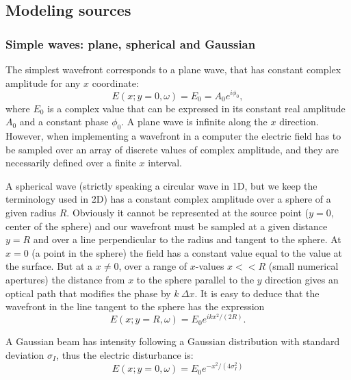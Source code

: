 \documentclass[preprint]{iucr}              %
\begin{document}
\subsection{Modeling sources}
\label{sec:sources}

\subsubsection{Simple waves: plane, spherical and Gaussian}

The simplest wavefront corresponds to a plane wave, that has constant complex amplitude for any $x$ coordinate: 
\begin{equation}
   E(x;y=0,\omega)=E_0=A_0 e^{i \phi_0},
\end{equation}
where $E_0$ is a complex value that can be expressed in its constant real  amplitude $A_0$ and a constant phase $\phi_0$. A plane wave is infinite along the $x$ direction. However, when implementing a wavefront in a computer the electric field has to be sampled over an array of discrete values of complex amplitude, and they are necessarily defined over a finite $x$ interval. 

A spherical wave (strictly speaking a circular wave in 1D, but we keep the terminology used in 2D) has a constant complex amplitude over a sphere of a given radius $R$. Obviously it cannot be represented at the source point ($y=0$, center of the sphere) and our wavefront must be sampled at a given distance $y=R$ and over a line perpendicular to the radius and tangent to the sphere. At $x=0$ (a point in the sphere) the field has a constant value equal to the value at the surface. But at a $x\ne$0, over a range of $x$-values $x<<R$ (small numerical apertures) the distance from $x$ to the sphere parallel to the $y$ direction gives an optical path that modifies the phase by $k ~\Delta x$. It is easy to deduce that the wavefront in the line tangent to the sphere has the expression
\begin{equation}
\label{eq:sphericalWave}
    E(x;y=R,\omega)  = E_0 e^{i k x^2 / (2 R)}.
\end{equation}



A Gaussian beam has intensity following a Gaussian distribution with standard deviation $\sigma_I$, thus the electric disturbance is: 
\begin{equation}
\label{eq:gaussianSource}
    E(x;y=0,\omega) = E_0 e^{-x^2 / (4 \sigma_I^2)}
\end{equation}
\end{document}
